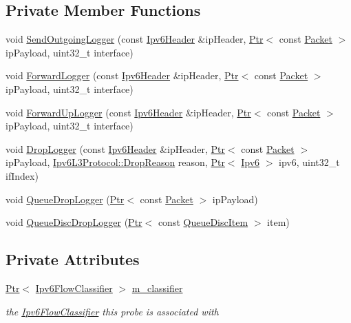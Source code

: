 \subsection*{Private Member Functions}
\begin{DoxyCompactItemize}
\item 
void \hyperlink{classns3_1_1Ipv6FlowProbe_aed2d199576287ec3c4d411c03b28c837}{Send\+Outgoing\+Logger} (const \hyperlink{classns3_1_1Ipv6Header}{Ipv6\+Header} \&ip\+Header, \hyperlink{classns3_1_1Ptr}{Ptr}$<$ const \hyperlink{classns3_1_1Packet}{Packet} $>$ ip\+Payload, uint32\+\_\+t interface)
\item 
void \hyperlink{classns3_1_1Ipv6FlowProbe_a9efca78a831129405b52035b062feec8}{Forward\+Logger} (const \hyperlink{classns3_1_1Ipv6Header}{Ipv6\+Header} \&ip\+Header, \hyperlink{classns3_1_1Ptr}{Ptr}$<$ const \hyperlink{classns3_1_1Packet}{Packet} $>$ ip\+Payload, uint32\+\_\+t interface)
\item 
void \hyperlink{classns3_1_1Ipv6FlowProbe_abed89107dd0b552bb83d8426293d63a5}{Forward\+Up\+Logger} (const \hyperlink{classns3_1_1Ipv6Header}{Ipv6\+Header} \&ip\+Header, \hyperlink{classns3_1_1Ptr}{Ptr}$<$ const \hyperlink{classns3_1_1Packet}{Packet} $>$ ip\+Payload, uint32\+\_\+t interface)
\item 
void \hyperlink{classns3_1_1Ipv6FlowProbe_a8b22af31a51e16a103ad6ad1ad293e2c}{Drop\+Logger} (const \hyperlink{classns3_1_1Ipv6Header}{Ipv6\+Header} \&ip\+Header, \hyperlink{classns3_1_1Ptr}{Ptr}$<$ const \hyperlink{classns3_1_1Packet}{Packet} $>$ ip\+Payload, \hyperlink{classns3_1_1Ipv6L3Protocol_a33c64db9bc35f71ff368b132bfffa37a}{Ipv6\+L3\+Protocol\+::\+Drop\+Reason} reason, \hyperlink{classns3_1_1Ptr}{Ptr}$<$ \hyperlink{classns3_1_1Ipv6}{Ipv6} $>$ ipv6, uint32\+\_\+t if\+Index)
\item 
void \hyperlink{classns3_1_1Ipv6FlowProbe_a5219691c8446ab59564014e9658d3187}{Queue\+Drop\+Logger} (\hyperlink{classns3_1_1Ptr}{Ptr}$<$ const \hyperlink{classns3_1_1Packet}{Packet} $>$ ip\+Payload)
\item 
void \hyperlink{classns3_1_1Ipv6FlowProbe_a1f0d7560a3a5f7fc3bc999825067037b}{Queue\+Disc\+Drop\+Logger} (\hyperlink{classns3_1_1Ptr}{Ptr}$<$ const \hyperlink{classns3_1_1QueueDiscItem}{Queue\+Disc\+Item} $>$ item)
\end{DoxyCompactItemize}
\subsection*{Private Attributes}
\begin{DoxyCompactItemize}
\item 
\hyperlink{classns3_1_1Ptr}{Ptr}$<$ \hyperlink{classns3_1_1Ipv6FlowClassifier}{Ipv6\+Flow\+Classifier} $>$ \hyperlink{classns3_1_1Ipv6FlowProbe_a6b4af52e7aef1c6d73e4072afb734da1}{m\+\_\+classifier}
\begin{DoxyCompactList}\small\item\em the \hyperlink{classns3_1_1Ipv6FlowClassifier}{Ipv6\+Flow\+Classifier} this probe is associated with \end{DoxyCompactList}\end{DoxyCompactItemize}
